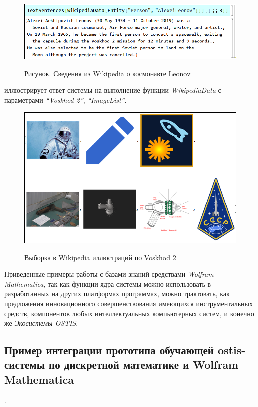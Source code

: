 \begin{figure}[H]
	\caption{Рисунок. Сведения из Wikipedia о космонавте Leonov}
	\includegraphics[scale=0.55]{images/part7/chapter_integration/integr_alg6.png}
	\label{fig:integr_alg6}
\end{figure}

\textit{} иллюстрирует ответ системы на выполнение функции \textit{WikipediaData} с параметрами \textit{``Voskhod 2''}, \textit{``ImageList''}.

\begin{figure}[H]
	\caption{Выборка в Wikipedia иллюстраций по Voskhod 2}
	\includegraphics[scale=0.56]{images/part7/chapter_integration/integr_alg7.png}
	\label{fig:integr_alg7}
\end{figure}

Приведенные примеры работы с базами знаний средствами \textit{Wolfram Mathematica}, так как функции ядра системы можно использовать в разработанных на других платформах программах, можно трактовать, как предложения инновационного совершенствования имеющихся инструментальных средств, компонентов любых интеллектуальных компьютерных систем, и конечно же \textit{Экосистемы OSTIS}.

\subsection{Пример интеграции прототипа обучающей ostis-системы по дискретной математике и Wolfram Mathematica}.
\label{subsec_cas_intergation}

